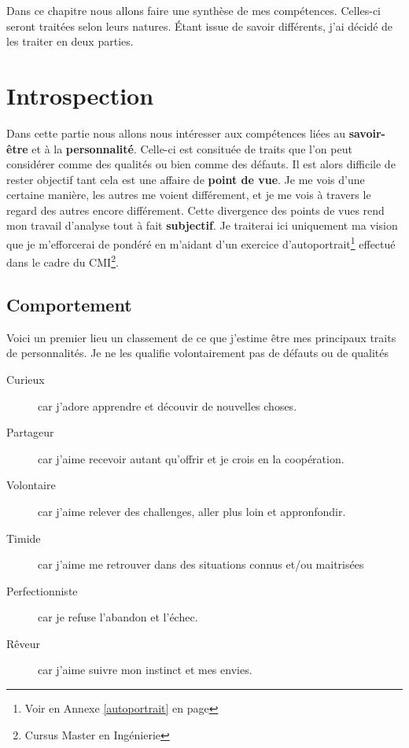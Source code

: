 \documentclass[a4paper,12pt, draft]{report}
\begin{document}
Dans ce chapitre nous allons faire une synthèse de mes compétences.
Celles-ci seront traitées selon leurs natures.
Étant issue de savoir différents, j'ai décidé de les traiter en deux parties.


\section{Introspection}
Dans cette partie nous allons nous intéresser aux compétences liées au \textbf{savoir-être} et à la \textbf{personnalité}. Celle-ci est consituée de traits que l'on peut considérer comme des qualités ou bien comme des défauts. Il est alors difficile de rester objectif tant cela est une affaire de \textbf{point de vue}. Je me vois d'une certaine manière, les autres me voient différement, et je me vois à travers le regard des autres encore différement. Cette divergence des points de vues rend mon travail d'analyse tout à fait \textbf{subjectif}. Je traiterai ici uniquement ma vision que je m'efforcerai de pondéré en m'aidant d'un exercice d'autoportrait\footnote{Voir en Annexe \ref{autoportrait} en page \pageref{autoportrait}} effectué dans le cadre du CMI\footnote{Cursus Master en Ingénierie}.

\newpage
\subsection{Comportement}

Voici un premier lieu un classement de ce que j'estime être mes principaux traits de personnalités. Je ne les qualifie volontairement pas de défauts ou de qualités\\

\begin{description}
\item [Curieux]car j'adore apprendre et découvir de nouvelles choses.
\item [Partageur]car j'aime recevoir autant qu'offrir et je crois en la coopération.
\item [Volontaire]car j'aime relever des challenges, aller plus loin et appronfondir.
\item [Timide]car j'aime me retrouver dans des situations connus et/ou maitrisées
\item [Perfectionniste]car je refuse l'abandon et l'échec.
\item [Rêveur]car j'aime suivre mon instinct et mes envies.
\end{description}
\end{document}
